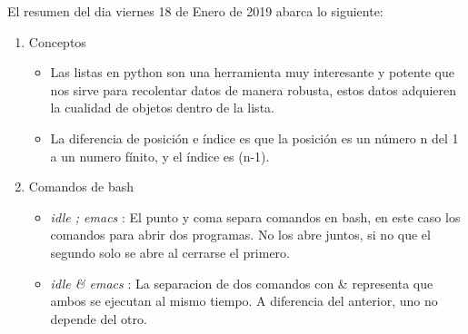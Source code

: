 \documentclass[letterpaper, 12pt,oneside]{article}
\begin{document}
	El resumen del dia viernes 18 de Enero de 2019 abarca lo siguiente:
	\begin{enumerate}
		\item Conceptos
			\begin{itemize}
				\item Las listas en python son una herramienta muy interesante y potente que nos sirve para recolentar datos de manera robusta, estos datos adquieren la cualidad de objetos dentro de la lista.
				\item La diferencia de posición e índice es que la posición es un número n del 1 a un numero fínito, y el índice es (n-1).
			\end{itemize}
		
		\item Comandos de bash
			\begin{itemize}
				\item {\textit{idle ; emacs} }: El punto y coma separa comandos en bash, en este caso los comandos para abrir dos programas. No los abre juntos, si no que el segundo solo se abre al cerrarse el primero.
				\item {\textit{idle \& emacs}} : La separacion de dos comandos con \& representa que ambos se ejecutan al mismo tiempo. A diferencia del anterior, uno no depende del otro.
			\end{itemize}
		

\end{enumerate}
\end{document}
